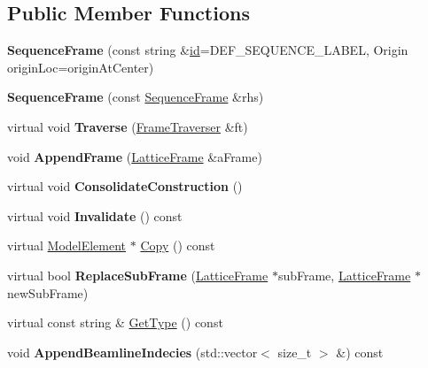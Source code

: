 \subsection*{Public Member Functions}
\begin{DoxyCompactItemize}
\item 
\mbox{\label{classSequenceFrame_ab6a5e2fa66bcd6e0744489a8170df348}} 
{\bfseries Sequence\+Frame} (const string \&\hyperlink{classModelElement_aada171ead2085c75b592cf07d91bc5c2}{id}=D\+E\+F\+\_\+\+S\+E\+Q\+U\+E\+N\+C\+E\+\_\+\+L\+A\+B\+EL, Origin origin\+Loc=origin\+At\+Center)
\item 
\mbox{\label{classSequenceFrame_a65c40d3fd5671db149651db0fbfcc185}} 
{\bfseries Sequence\+Frame} (const \hyperlink{classSequenceFrame}{Sequence\+Frame} \&rhs)
\item 
\mbox{\label{classSequenceFrame_a20c3bddb8d3d149c8d5141da1d781d76}} 
virtual void {\bfseries Traverse} (\hyperlink{classFrameTraverser}{Frame\+Traverser} \&ft)
\item 
\mbox{\label{classSequenceFrame_a041dc63435f279e2f056bd448e8bd7bb}} 
void {\bfseries Append\+Frame} (\hyperlink{classLatticeFrame}{Lattice\+Frame} \&a\+Frame)
\item 
\mbox{\label{classSequenceFrame_a736baa6844f937a77d179e8346908a1e}} 
virtual void {\bfseries Consolidate\+Construction} ()
\item 
\mbox{\label{classSequenceFrame_a0ad78d1801cb3e13ee866e0d4c4a039a}} 
virtual void {\bfseries Invalidate} () const
\item 
virtual \hyperlink{classModelElement}{Model\+Element} $\ast$ \hyperlink{classSequenceFrame_a89a9046c330fa9955cd2e6b67b5c64f7}{Copy} () const
\item 
\mbox{\label{classSequenceFrame_a28a9d8fb9705d3acf8bd112deebdb31c}} 
virtual bool {\bfseries Replace\+Sub\+Frame} (\hyperlink{classLatticeFrame}{Lattice\+Frame} $\ast$sub\+Frame, \hyperlink{classLatticeFrame}{Lattice\+Frame} $\ast$new\+Sub\+Frame)
\item 
virtual const string \& \hyperlink{classSequenceFrame_a062ab78de738251ac5af6c62b470edcf}{Get\+Type} () const
\item 
\mbox{\label{classSequenceFrame_a3ab546d353c2e0e306f596c96ff483ae}} 
void {\bfseries Append\+Beamline\+Indecies} (std\+::vector$<$ size\+\_\+t $>$ \&) const
\end{DoxyCompactItemize}
